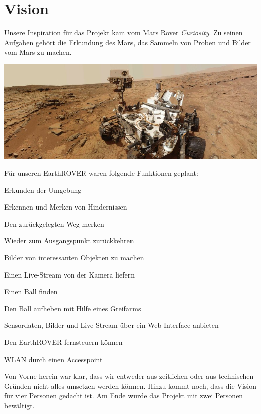\chapter{Vision}
Unsere Inspiration für das Projekt kam vom Mars Rover \textit{Curiosity}. Zu seinen Aufgaben gehört die Erkundung des Mars, das Sammeln von Proben und Bilder vom Mars zu machen. 

\begin{capfigure}[Curiosity]
	\includegraphics[width=\textwidth]{images/curiosity/curiosity}
\end{capfigure}

Für unseren EarthROVER waren folgende Funktionen geplant:
\begin{capitemize}
	\item Erkunden der Umgebung
	\item Erkennen und Merken von Hindernissen
	\item Den zurückgelegten Weg merken
	\item Wieder zum Ausgangspunkt zurückkehren
	\item Bilder von interessanten Objekten zu machen
	\item Einen Live-Stream von der Kamera liefern
	\item Einen Ball finden
	\item Den Ball aufheben mit Hilfe eines Greifarms
	\item Sensordaten, Bilder und Live-Stream über ein Web-Interface anbieten
	\item Den EarthROVER fernsteuern können
	\item WLAN durch einen Accesspoint
\end{capitemize}

Von Vorne herein war klar, dass wir entweder aus zeitlichen oder aus technischen Gründen nicht alles umsetzen werden können. Hinzu kommt noch, dass die Vision für vier Personen gedacht ist. Am Ende wurde das Projekt mit zwei Personen bewältigt.